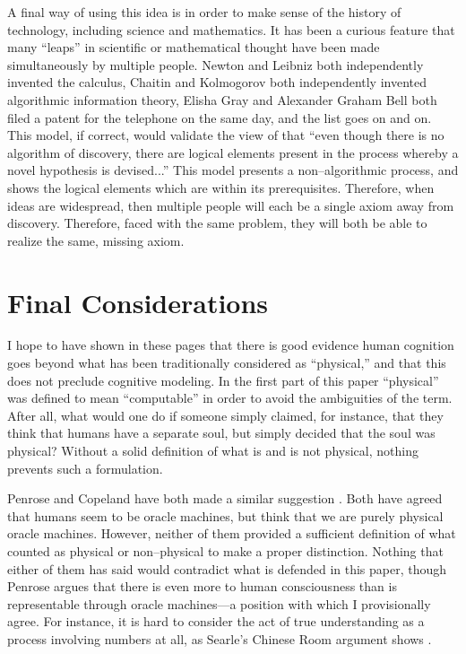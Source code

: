 A final way of using this idea is in order to make sense of the history of technology, including science and mathematics.  It has been a curious feature that many ``leaps'' in scientific or mathematical thought have been made simultaneously by multiple people.  Newton and Leibniz both independently invented the calculus, Chaitin and Kolmogorov both independently invented algorithmic information theory, Elisha Gray and Alexander Graham Bell both filed a patent for the telephone on the same day, and the list goes on and on.  This model, if correct, would validate the view of \citet{stokes1986} that ``even though there is no algorithm of discovery, there are logical elements present in the process whereby a novel hypothesis is devised...''  This model presents a non--algorithmic process, and shows the logical elements which are within its prerequisites.  Therefore, when ideas are widespread, then multiple people will each be a single axiom away from discovery.  Therefore, faced with the same problem, they will both be able to realize the same, missing axiom.

\section{Final Considerations}

I hope to have shown in these pages that there is good evidence human cognition goes beyond what has been traditionally considered as ``physical,'' and that this does not preclude cognitive modeling.  In the first part of this paper ``physical'' was defined to mean ``computable'' in order to avoid the ambiguities of the term.  After all, what would one do if someone simply claimed, for instance, that they think that humans have a separate soul, but simply decided that the soul was physical?  Without a solid definition of what is and is not physical, nothing prevents such a formulation.   

Penrose and Copeland have both made a similar suggestion \citep{copeland1998, hodges2000}.  Both have agreed that humans seem to be oracle machines, but think that we are purely physical oracle machines.  However, neither of them provided a sufficient definition of what counted as physical or non--physical to make a proper distinction.  Nothing that either of them has said would contradict what is defended in this paper, though Penrose argues that there is even more to human consciousness than is representable through oracle machines---a position with which I provisionally agree.   For instance, it is hard to consider the act of true understanding as a process involving numbers at all, as Searle's Chinese Room argument shows \citep{searle1980}.

